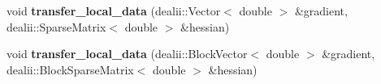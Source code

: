 \begin{DoxyCompactItemize}
\item 
\hypertarget{structSpacy_1_1dealII_1_1Detail_1_1LocalAssemblyBase_a2ed527f94c932b8277010186d3ad1a8d}{void {\bfseries transfer\-\_\-local\-\_\-data} (dealii\-::\-Vector$<$ double $>$ \&gradient, dealii\-::\-Sparse\-Matrix$<$ double $>$ \&hessian)}\label{structSpacy_1_1dealII_1_1Detail_1_1LocalAssemblyBase_a2ed527f94c932b8277010186d3ad1a8d}

\item 
\hypertarget{structSpacy_1_1dealII_1_1Detail_1_1LocalAssemblyBase_a0fa5b7e2be1fbeb8e26f0ea3e755cdd3}{void {\bfseries transfer\-\_\-local\-\_\-data} (dealii\-::\-Block\-Vector$<$ double $>$ \&gradient, dealii\-::\-Block\-Sparse\-Matrix$<$ double $>$ \&hessian)}\label{structSpacy_1_1dealII_1_1Detail_1_1LocalAssemblyBase_a0fa5b7e2be1fbeb8e26f0ea3e755cdd3}

\end{DoxyCompactItemize}
